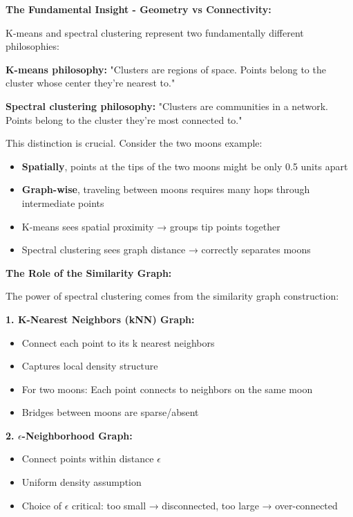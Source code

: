 \documentclass[12pt]{article}
\begin{document}
\begin{explanation}

\textbf{The Fundamental Insight - Geometry vs Connectivity:}

K-means and spectral clustering represent two fundamentally different philosophies:

\textbf{K-means philosophy:} "Clusters are regions of space. Points belong to the cluster whose center they're nearest to."

\textbf{Spectral clustering philosophy:} "Clusters are communities in a network. Points belong to the cluster they're most connected to."

This distinction is crucial. Consider the two moons example:
\begin{itemize}
    \item \textbf{Spatially}, points at the tips of the two moons might be only 0.5 units apart
    \item \textbf{Graph-wise}, traveling between moons requires many hops through intermediate points
    \item K-means sees spatial proximity → groups tip points together
    \item Spectral clustering sees graph distance → correctly separates moons
\end{itemize}

\textbf{The Role of the Similarity Graph:}

The power of spectral clustering comes from the similarity graph construction:

\textbf{1. K-Nearest Neighbors (kNN) Graph:}
\begin{itemize}
    \item Connect each point to its k nearest neighbors
    \item Captures local density structure
    \item For two moons: Each point connects to neighbors on the same moon
    \item Bridges between moons are sparse/absent
\end{itemize}

\textbf{2. $\epsilon$-Neighborhood Graph:}
\begin{itemize}
    \item Connect points within distance $\epsilon$
    \item Uniform density assumption
    \item Choice of $\epsilon$ critical: too small → disconnected, too large → over-connected
\end{itemize}


\end{explanation}
\end{document}
